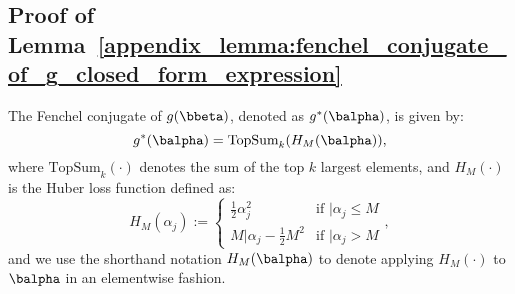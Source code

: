 \subsection{Proof of Lemma~\ref{appendix_lemma:fenchel_conjugate_of_g_closed_form_expression}}
\label{appendix_subsec:proof_fenchel_conjugate_of_g_closed_form_expression}

\begin{namedlemma}[~\ref{appendix_lemma:fenchel_conjugate_of_g_closed_form_expression}]
    \label{appendix_lemma:fenchel_conjugate_of_g_closed_form_expression}
    The Fenchel conjugate of $g(\bbeta)$, denoted as $g^*(\balpha)$, is given by:
    \begin{equation}
        g^*(\balpha) = \text{TopSum}_k(H_M(\balpha)),
    \end{equation}
    where $\text{TopSum}_k(\cdot)$ denotes the sum of the top $k$ largest elements, and $H_M(\cdot)$ is the Huber loss function defined as:
    \begin{equation}
        H_M(\alpha_j) := \begin{cases}
            \frac{1}{2} \alpha_j^2 & \text{if } \vert{\alpha_j} \leq M \\
            M \vert{\alpha_j} - \frac{1}{2} M^2 & \text{if } \vert{\alpha_j} > M
        \end{cases},
    \end{equation}
    and we use the shorthand notation $H_M(\balpha)$ to denote applying $H_M(\cdot)$ to $\balpha$ in an elementwise fashion.
\end{namedlemma}

